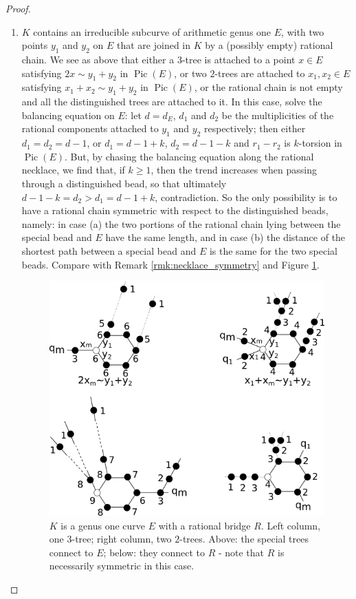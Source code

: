 \documentclass[11pt]{amsart}
\newcommand{\Pic}{\operatorname{Pic}}
\theoremstyle{plain}
\theoremstyle{definition}
\begin{document}
\begin{proof}
\begin{enumerate}[leftmargin=.6cm]
 \item\label{KinDirr} $K$ contains an irreducible subcurve of arithmetic genus one $E$, with two points $y_1$ and $y_2$ on $E$ that are joined in $K$ by a (possibly empty) rational chain. We see as above that either a $3$-tree is attached to a point $x\in E$ satisfying $2x\sim y_1+y_2$ in $\Pic(E)$, or two $2$-trees are attached to $x_1,x_2\in E$ satisfying $x_1+x_2\sim y_1+y_2$ in $\Pic(E)$, or the rational chain is not empty and all the distinguished trees are attached to it. In this case, solve the balancing equation on $E$: let $d=d_E$, $d_1$ and $d_2$ be the multiplicities of the rational components attached to $y_1$ and $y_2$ respectively; then either $d_1=d_2=d-1$, or $d_1=d-1+k$, $d_2=d-1-k$ and $r_1-r_2$ is $k$-torsion in $\Pic(E)$. But, by chasing the balancing equation along the rational necklace, we find that, if $k\geq 1$, then the trend increases when passing through a distinguished bead, so that ultimately $d-1-k=d_2>d_1=d-1+k$, contradiction. So the only possibility is to have a rational chain symmetric with respect to the distinguished beads, namely: in case (a) the two portions of the rational chain lying between the special bead and $E$ have the same length, and in case (b) the distance of the shortest path between a special bead and $E$ is the same for the two special beads. Compare with Remark \ref{rmk:necklace_symmetry} and Figure \ref{fig:ER}.
 
  \begin{figure}[h]
 \includegraphics[width=.8\textwidth]{ERexample}
 \caption{$K$ is a genus one curve $E$ with a rational bridge $R$. Left column, one $3$-tree; right column, two $2$-trees. Above: the special trees connect to $E$; below: they connect to $R$ - note that $R$ is necessarily symmetric in this case.}\label{fig:ER}
  \end{figure}
 

\end{enumerate}
\end{proof}
\end{document}
